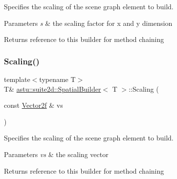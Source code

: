 Specifies the scaling of the scene graph element to build.


\begin{DoxyParams}{Parameters}
{\em s} & the scaling factor for x and y dimension \\
\hline
\end{DoxyParams}
\begin{DoxyReturn}{Returns}
reference to this builder for method chaining 
\end{DoxyReturn}
\mbox{\label{classastu_1_1suite2d_1_1SpatialBuilder_a536ee9865573bcbeaa1b9db996610eeb}} 
\subsubsection{\texorpdfstring{Scaling()}{Scaling()}\hspace{0.1cm}{\footnotesize\ttfamily [2/3]}}
{\footnotesize\ttfamily template$<$typename T$>$ \\
T\& \hyperlink{classastu_1_1suite2d_1_1SpatialBuilder}{astu\+::suite2d\+::\+Spatial\+Builder}$<$ T $>$\+::Scaling (\begin{DoxyParamCaption}\item[{const \hyperlink{classastu_1_1Vector2}{Vector2f} \&}]{vs }\end{DoxyParamCaption})\hspace{0.3cm}{\ttfamily [inline]}}

Specifies the scaling of the scene graph element to build.


\begin{DoxyParams}{Parameters}
{\em vs} & the scaling vector \\
\hline
\end{DoxyParams}
\begin{DoxyReturn}{Returns}
reference to this builder for method chaining 
\end{DoxyReturn}
\mbox{\label{classastu_1_1suite2d_1_1SpatialBuilder_a085a3c05bc1f45a49336ebf7a275a522}} 
